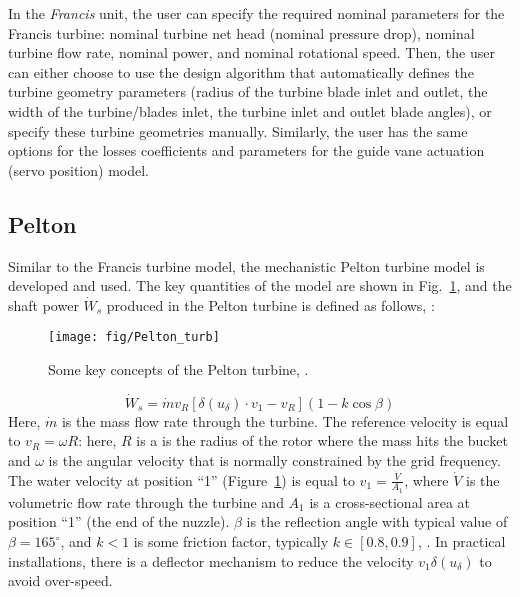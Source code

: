 \documentclass[%
]{USN-PhD}
\begin{document}
In the \emph{Francis} unit, the user can specify the required nominal parameters for the Francis turbine:  nominal turbine net head (nominal pressure drop), nominal turbine flow rate, nominal power, and nominal rotational speed. Then, the user can either choose to use the design algorithm that automatically defines the turbine geometry parameters (radius of the turbine blade inlet and outlet, the width of the turbine/blades inlet, the turbine inlet and outlet blade angles), or specify these turbine geometries manually. Similarly, the user has the same options for the losses coefficients and parameters for the guide vane actuation (servo position) model.

\subsection{Pelton}

Similar to the Francis turbine model, the mechanistic Pelton turbine model is developed and used. The key quantities of the model are shown in Fig.~\ref{fig:fig14}, and the shaft power $\dot{W}_s$ produced in the Pelton turbine is defined as follows, \cite{LieL:18}:
\begin{figure}
\begin{center}
\texttt{[image: fig/Pelton\_turb]} %
\caption{Some key concepts of the Pelton turbine, \cite{LieL:18}.}
\label{fig:fig14}
\end{center}
\end{figure}

\begin{equation}
\dot{W}_s=\dot{m}v_R\left[\delta(u_\delta)\cdot v_1-v_R\right]\left(1-k\cos\beta\right)
\end{equation}
Here, $\dot{m}$ is the mass flow rate through the turbine. The reference velocity is equal to $v_R = \omega R$: here, $R$ is a is the radius of the rotor where the mass hits the bucket and $\omega$ is the angular velocity that is normally constrained by the grid frequency. The water velocity at position ``1'' (Figure~\ref{fig:fig14}) is equal to $v_1=\frac{\dot{V}}{A_1}$, where $\dot{V}$ is the volumetric flow rate through the turbine and $A_1$ is a cross-sectional area at position ``1'' (the end of the nuzzle). $\beta$ is the reflection angle with typical value of $\beta= 165^{\circ}$, and $k<1$ is some friction factor, typically $k\in[0.8, 0.9]$, \cite{LieL:18}. In practical installations, there is a deflector mechanism to reduce the velocity $v_1\delta(u_\delta)$ to avoid over-speed.
\end{document}
